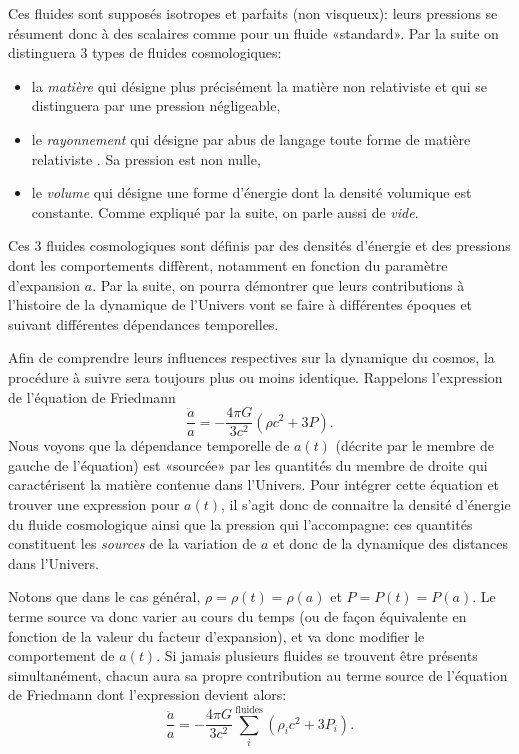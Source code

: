 Ces fluides sont supposés isotropes et parfaits (non visqueux): leurs pressions se résument donc à des scalaires comme pour un fluide «standard». Par la suite on distinguera 3 types de fluides cosmologiques:
\begin{itemize}
\item la \textit{matière} qui désigne plus précisément la matière non relativiste et qui se distinguera par une pression négligeable,
\item le \textit{rayonnement} qui désigne par abus de langage toute forme de matière relativiste . Sa pression est non nulle,
\item le \textit{volume} qui désigne une forme d'énergie dont la densité volumique est constante. Comme expliqué par la suite, on parle aussi de \textit{vide}.
\end{itemize}
Ces 3 fluides cosmologiques sont définis par des densités d'énergie et des pressions dont les comportements diffèrent, notamment en fonction du paramètre d'expansion $a$. Par la suite, on pourra démontrer que leurs contributions à l'histoire de la dynamique de l'Univers vont se faire à différentes époques et suivant différentes dépendances temporelles.

Afin de comprendre leurs influences respectives sur la dynamique du cosmos, la procédure à suivre sera toujours plus ou moins identique. Rappelons l'expression de l'équation de Friedmann
\begin{equation}
\frac{\ddot a}{a}=-\frac{4\pi G}{3c^2}(\rho c^2 +3 P).
\end{equation}
Nous voyons que la dépendance temporelle de $a(t)$ (décrite par le membre de gauche de l'équation) est «sourcée» par les quantités du membre de droite qui caractérisent la matière contenue dans l'Univers.
Pour intégrer cette équation et trouver une expression pour $a(t)$, il s'agit donc de connaitre la densité d'énergie du fluide cosmologique ainsi que la pression qui l'accompagne: ces quantités constituent les \textit{sources} de la variation de $a$ et donc de la dynamique des distances dans l'Univers. 

Notons que dans le cas général, $\rho=\rho(t)=\rho(a)$ et $P=P(t)=P(a)$. Le terme source va donc varier au cours du temps (ou de façon équivalente en fonction de la valeur du facteur d'expansion), et va donc modifier le comportement de $a(t)$. Si jamais plusieurs fluides se trouvent être présents simultanément, chacun aura sa propre contribution au terme source de l'équation de Friedmann dont l'expression devient alors:
\begin{equation}
\frac{\ddot a}{a}=-\frac{4\pi G}{3c^2}\sum_i^\mathrm{fluides}(\rho_i c^2 +3 P_i).
\end{equation}

